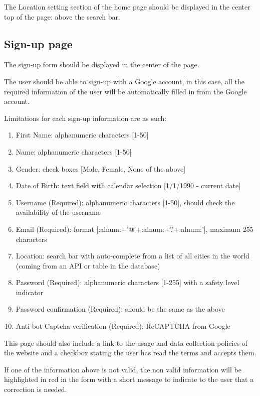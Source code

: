 \documentclass[conference]{IEEEtran}
\begin{document}
The Location setting section of the home page should be displayed in the center top of the page: above the search bar.

\subsection{Sign-up page}

The sign-up form should be displayed in the center of the page.

The user should be able to sign-up with a Google account, in this case, all the required information of the user will be automatically filled in from the Google account.

Limitations for each sign-up information are as such:

\begin{enumerate}
    \item First Name: alphanumeric characters [1-50]
    \item Name: alphanumeric characters [1-50]
    \item Gender: check boxes [Male, Female, None of the above]
    \item Date of Birth: text field with calendar selection [1/1/1990 - current date]
    \item Username (Required): alphanumeric characters [1-50], should check the availability of the username
    \item Email (Required): format [:alnum:+'@'+:alnum:+'.'+:alnum:'], maximum 255 characters
    \item Location: search bar with auto-complete from a list of all cities in the world (coming from an API or table in the database)
    \item Password (Required): alphanumeric characters [1-255] with a safety level indicator
    \item Password confirmation (Required): should be the same as the above
    \item Anti-bot Captcha verification (Required): ReCAPTCHA from Google
\end{enumerate}

This page should also include a link to the usage and data collection policies of the website and a checkbox stating the user has read the terms and accepts them.

If one of the information above is not valid, the non valid information will be highlighted in red in the form with a short message to indicate to the user that a correction is needed.
\end{document}

